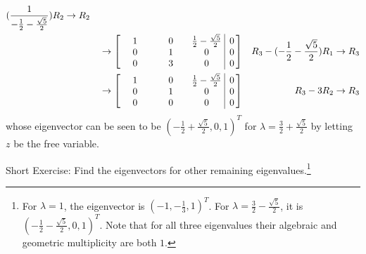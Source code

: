 \begin{solution}
\begin{align*}
\begin{aligned}
(\frac{1}{-\frac{1}{2}-\frac{\sqrt{5}}{2}})R_2 &\to R_2
\end{aligned} \\
&\to
\left[\begin{array}{@{\,}wc{28pt}wc{28pt}wc{28pt}|c@{\,}}
1 & 0 & \frac{1}{2}-\frac{\sqrt{5}}{2} & 0 \\
0 & 1 & 0 & 0 \\
0 & 3 & 0 & 0
\end{array}\right] & R_3 - (-\frac{1}{2}-\frac{\sqrt{5}}{2})R_1 \to R_3 \\
&\to
\left[\begin{array}{@{\,}wc{28pt}wc{28pt}wc{28pt}|c@{\,}}
1 & 0 & \frac{1}{2}-\frac{\sqrt{5}}{2} & 0 \\
0 & 1 & 0 & 0 \\
0 & 0 & 0 & 0
\end{array}\right] & R_3 - 3R_2 \to R_3
\end{align*}
whose eigenvector can be seen to be $(-\frac{1}{2}+\frac{\sqrt{5}}{2},0,1)^T$ for $\lambda = \frac{3}{2} + \frac{\sqrt{5}}{2}$ by letting $z$ be the free variable.
\end{solution}
Short Exercise: Find the eigenvectors for other remaining eigenvalues.\footnote{For $\lambda = 1$, the eigenvector is $(-1,-\frac{1}{3},1)^T$. For $\lambda = \frac{3}{2} - \frac{\sqrt{5}}{2}$, it is $(-\frac{1}{2}-\frac{\sqrt{5}}{2},0,1)^T$. Note that for all three eigenvalues their algebraic and geometric multiplicity are both $1$.}

